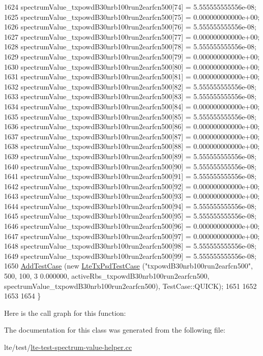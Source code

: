 \begin{DoxyCode}
1624   spectrumValue\_txpowdB30nrb100run2earfcn500[74] = 5.555555555556e-08;
1625   spectrumValue\_txpowdB30nrb100run2earfcn500[75] = 0.000000000000e+00;
1626   spectrumValue\_txpowdB30nrb100run2earfcn500[76] = 5.555555555556e-08;
1627   spectrumValue\_txpowdB30nrb100run2earfcn500[77] = 0.000000000000e+00;
1628   spectrumValue\_txpowdB30nrb100run2earfcn500[78] = 5.555555555556e-08;
1629   spectrumValue\_txpowdB30nrb100run2earfcn500[79] = 0.000000000000e+00;
1630   spectrumValue\_txpowdB30nrb100run2earfcn500[80] = 0.000000000000e+00;
1631   spectrumValue\_txpowdB30nrb100run2earfcn500[81] = 0.000000000000e+00;
1632   spectrumValue\_txpowdB30nrb100run2earfcn500[82] = 5.555555555556e-08;
1633   spectrumValue\_txpowdB30nrb100run2earfcn500[83] = 5.555555555556e-08;
1634   spectrumValue\_txpowdB30nrb100run2earfcn500[84] = 0.000000000000e+00;
1635   spectrumValue\_txpowdB30nrb100run2earfcn500[85] = 5.555555555556e-08;
1636   spectrumValue\_txpowdB30nrb100run2earfcn500[86] = 0.000000000000e+00;
1637   spectrumValue\_txpowdB30nrb100run2earfcn500[87] = 0.000000000000e+00;
1638   spectrumValue\_txpowdB30nrb100run2earfcn500[88] = 0.000000000000e+00;
1639   spectrumValue\_txpowdB30nrb100run2earfcn500[89] = 5.555555555556e-08;
1640   spectrumValue\_txpowdB30nrb100run2earfcn500[90] = 5.555555555556e-08;
1641   spectrumValue\_txpowdB30nrb100run2earfcn500[91] = 5.555555555556e-08;
1642   spectrumValue\_txpowdB30nrb100run2earfcn500[92] = 0.000000000000e+00;
1643   spectrumValue\_txpowdB30nrb100run2earfcn500[93] = 0.000000000000e+00;
1644   spectrumValue\_txpowdB30nrb100run2earfcn500[94] = 5.555555555556e-08;
1645   spectrumValue\_txpowdB30nrb100run2earfcn500[95] = 5.555555555556e-08;
1646   spectrumValue\_txpowdB30nrb100run2earfcn500[96] = 0.000000000000e+00;
1647   spectrumValue\_txpowdB30nrb100run2earfcn500[97] = 0.000000000000e+00;
1648   spectrumValue\_txpowdB30nrb100run2earfcn500[98] = 5.555555555556e-08;
1649   spectrumValue\_txpowdB30nrb100run2earfcn500[99] = 5.555555555556e-08;
1650   \hyperlink{classns3_1_1TestCase_a3718088e3eefd5d6454569d2e0ddd835}{AddTestCase} (\textcolor{keyword}{new} \hyperlink{classLteTxPsdTestCase}{LteTxPsdTestCase} (\textcolor{stringliteral}{"txpowdB30nrb100run2earfcn500"}, 500, 100, 3
      0.000000, activeRbs\_txpowdB30nrb100run2earfcn500, spectrumValue\_txpowdB30nrb100run2earfcn500), 
      TestCase::QUICK);
1651 
1652 
1653 
1654 \}
\end{DoxyCode}


Here is the call graph for this function\+:




The documentation for this class was generated from the following file\+:\begin{DoxyCompactItemize}
\item 
lte/test/\hyperlink{lte-test-spectrum-value-helper_8cc}{lte-\/test-\/spectrum-\/value-\/helper.\+cc}\end{DoxyCompactItemize}
